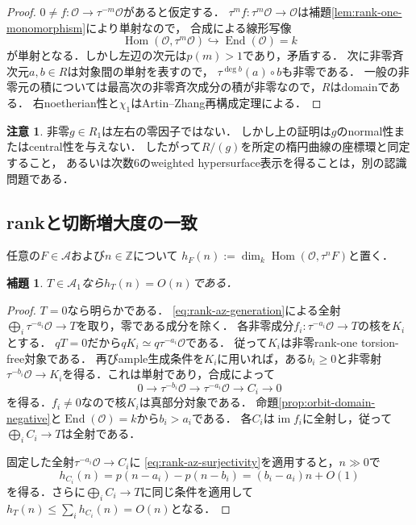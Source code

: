 \documentclass[11pt,a4paper]{ltjsarticle}
\newtheorem{lemma}[theorem]{補題}
\theoremstyle{definition}
\newtheorem{remark}[theorem]{注意}
\newcommand{\OO}{\mathcal O}
\renewcommand{\AA}{\mathcal A}
\newcommand{\Hom}{\operatorname{Hom}}
\newcommand{\End}{\operatorname{End}}
\begin{document}
\begin{proof}
$0\ne f:\OO\to\tau^{-m}\OO$があると仮定する．
$\tau^mf:\tau^m\OO\to\OO$は補題\ref{lem:rank-one-monomorphism}により単射なので，
合成による線形写像
\[
 \Hom(\OO,\tau^m\OO)\hookrightarrow\End(\OO)=k
\]
が単射となる．しかし左辺の次元は$p(m)>1$であり，矛盾する．
次に非零斉次元$a,b\in R$は対象間の単射を表すので，
$\tau^{\deg b}(a)\circ b$も非零である．
一般の非零元の積については最高次の非零斉次成分の積が非零なので，$R$はdomainである．
右noetherian性と$\chi_1$はArtin--Zhang再構成定理による．
\end{proof}

\begin{remark}
非零$g\in R_1$は左右の零因子ではない．
しかし上の証明は$g$のnormal性またはcentral性を与えない．
したがって$R/(g)$を所定の楕円曲線の座標環と同定すること，
あるいは次数6のweighted hypersurface表示を得ることは，別の認識問題である．
\end{remark}

\subsection{rankと切断増大度の一致}
任意の$F\in\AA$および$n\in\mathbb Z$について
$h_F(n):=\dim_k\Hom(\OO,\tau^nF)$と置く．

\begin{lemma}\label{lem:torsion-linear-growth}
$T\in\AA_1$なら$h_T(n)=O(n)$である．
\end{lemma}

\begin{proof}
$T=0$なら明らかである．
\eqref{eq:rank-az-generation}による全射
$\bigoplus_i\tau^{-a_i}\OO\to T$を取り，零である成分を除く．
各非零成分$f_i:\tau^{-a_i}\OO\to T$の核を$K_i$とする．
$qT=0$だから$qK_i\simeq q\tau^{-a_i}\OO$である．
従って$K_i$は非零rank-one torsion-free対象である．
再びample生成条件を$K_i$に用いれば，ある$b_i\geq0$と非零射
$\tau^{-b_i}\OO\to K_i$を得る．これは単射であり，合成によって
\[
 0\longrightarrow\tau^{-b_i}\OO
   \longrightarrow\tau^{-a_i}\OO
   \longrightarrow C_i\longrightarrow0
\]
を得る．$f_i\ne0$なので核$K_i$は真部分対象である．
命題\ref{prop:orbit-domain-negative}と$\End(\OO)=k$から$b_i>a_i$である．
各$C_i$は$\operatorname{im}f_i$に全射し，従って
$\bigoplus_iC_i\to T$は全射である．

固定した全射$\tau^{-a_i}\OO\to C_i$に
\eqref{eq:rank-az-surjectivity}を適用すると，$n\gg0$で
\[
 h_{C_i}(n)=p(n-a_i)-p(n-b_i)
          =(b_i-a_i)n+O(1)
\]
を得る．さらに$\bigoplus_iC_i\to T$に同じ条件を適用して
$h_T(n)\leq\sum_i h_{C_i}(n)=O(n)$となる．
\end{proof}
\end{document}
